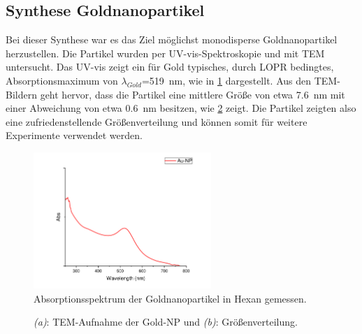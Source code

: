 \subsection{Synthese Goldnanopartikel}
	Bei dieser Synthese war es das Ziel möglichst monodisperse Goldnanopartikel herzustellen.
	Die Partikel wurden per UV-vis-Spektroskopie und mit TEM untersucht.
	Das UV-vis zeigt ein für Gold typisches, durch LOPR bedingtes, Absorptionsmaximum von $\lambda_{Gold}$=\SI{519}{\nano\meter}, wie in \cref{fig:UV-AuNP} dargestellt.
	Aus den TEM-Bildern geht hervor, dass die Partikel eine mittlere Größe von etwa \SI{7,6}{\nano\meter} mit einer Abweichung von etwa \SI{0,6}{\nano\meter} besitzen, wie \cref{fig:TEM-Au-Hex-2} zeigt.	
	Die Partikel zeigten also eine zufriedenstellende Größenverteilung und können somit für weitere Experimente verwendet werden.
	
	\begin{figure}[H]
		\centering
		\includegraphics[width=0.6\textwidth]{Bilder/Gold-NP-Organisch} 	
		\caption{Absorptionsspektrum der Goldnanopartikel in Hexan gemessen.}
		\label{fig:UV-AuNP}
	\end{figure}
	
	\begin{figure}[H]
		\centering
		\caption{\emph{(a)}: TEM-Aufnahme der Gold-NP und \emph{(b)}: Größenverteilung.}
		\label{fig:TEM-Au-Hex-2}
	\end{figure}

